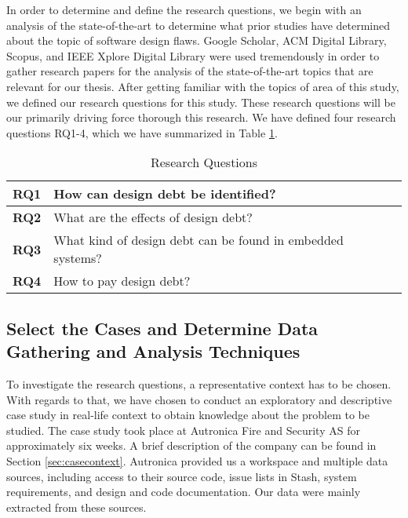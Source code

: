 In order to determine and define the research questions, we begin with an analysis of the state-of-the-art to determine what prior studies have determined about the topic of software design flaws. Google Scholar, ACM Digital Library, Scopus, and IEEE Xplore Digital Library were used tremendously in order to gather research papers for the analysis of the state-of-the-art topics that are relevant for our thesis. After getting familiar with the topics of area of this study, we defined our research questions for this study. These research questions will be our primarily driving force thorough this research. We have defined four research questions RQ1-4, which we have summarized in Table \ref{researchQuestionsChapter3}.

\begin{table}[]
	\centering
	\caption{Research Questions}
	\label{researchQuestionsChapter3}
	\begin{tabular}{|l|p{8cm}|}
		\hline
		\textbf{RQ1} & How can design debt be identified?     \\ \hline
		\textbf{RQ2} & What are the effects of design debt?  \\ \hline
		\textbf{RQ3} & What kind of design debt can be found in embedded systems? \\ \hline
		\textbf{RQ4} & How to pay design debt? \\ \hline
	\end{tabular}
\end{table}



\subsection{Select the Cases and Determine Data Gathering and Analysis Techniques} %
To investigate the research questions, a representative context has to be chosen. With regards to that, we have chosen to conduct an exploratory and descriptive case study in real-life context to obtain knowledge about the problem to be studied. The case study took place at Autronica Fire and Security AS for approximately six weeks. A brief description of the company can be found in Section \ref{sec:casecontext}. Autronica provided us a workspace and multiple data sources, including access to their source code, issue lists in Stash, system requirements, and design and code documentation. Our data were mainly extracted from these sources.

